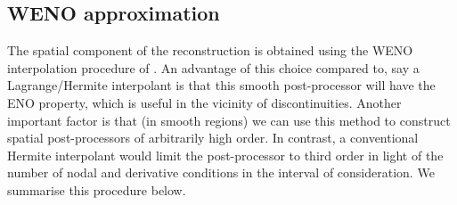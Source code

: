 \documentclass[final]{amsart}
\numberwithin{equation}{section}
\begin{document}
\subsection{WENO approximation}  The spatial component of the reconstruction is obtained using the WENO interpolation procedure of \cite{janett2019novel}.  An advantage of this choice compared to, say a  Lagrange/Hermite interpolant is that this smooth post-processor will have the ENO property, which is useful in the vicinity of discontinuities. Another important factor is that (in smooth regions) we can use this method to construct spatial post-processors of arbitrarily high order.  In contrast, a conventional Hermite interpolant would limit the post-processor to third order in light of the number of nodal and derivative conditions in the interval of consideration.  We summarise this procedure below.
\end{document}
